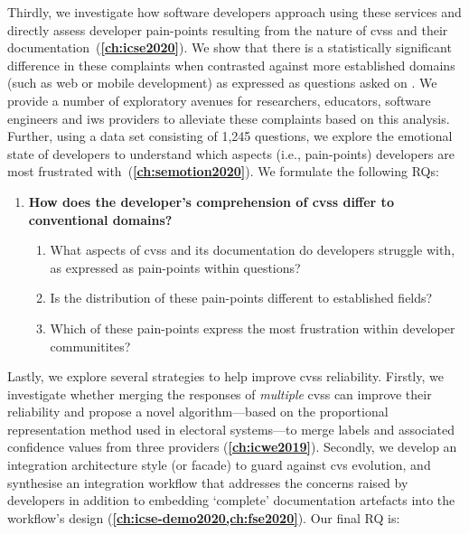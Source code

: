 Thirdly, we investigate how software developers approach using these services and directly assess developer pain-points resulting from the nature of \glspl{cvs} and their documentation~(\textbf{\cref{ch:icse2020}}). We show that there is a statistically significant difference in these complaints when contrasted against more established  domains (such as web or mobile development) as expressed as questions asked on . We provide a number of exploratory avenues for researchers, educators, software engineers and \gls{iws} providers to alleviate these complaints based on this analysis. Further, using a data set consisting of 1,245  questions, we explore the emotional state of developers to understand which aspects (i.e., pain-points) developers are most frustrated with~(\textbf{\cref{ch:semotion2020}}). We formulate the following RQs:

\begin{leftbar}
\begin{enumerate}[label=\faQuestionCircle~~\textbf{RQ\arabic*.}, ref=RQ\arabic*, leftmargin=2.75\parindent, rightmargin=1\parindent,start=3]
  \item \textbf{How does the developer's comprehension of \glspl{cvs} differ to conventional  domains?}\label{rq:icse} %
  \begin{enumerate}[label=\textit{RQ3.\arabic*.}, ref=RQ3.\arabic*]
    \item What aspects of \glspl{cvs} and its documentation do developers struggle with, as expressed as pain-points within  questions?\label{rq:icse:rq1}%
    \item Is the distribution of these pain-points different to established  fields?\label{rq:icse:rq2}%
    \item Which of these pain-points express the most frustration within developer communitites?\label{rq:semotion}
  \end{enumerate}
\end{enumerate}
\end{leftbar}


Lastly, we explore several strategies to help improve \glspl{cvs} reliability. Firstly, we investigate whether merging the responses of \textit{multiple} \glspl{cvs} can improve their reliability and propose a novel algorithm---based on the proportional representation method used in electoral systems---to merge labels and associated confidence values from three providers (\textbf{\cref{ch:icwe2019}}). Secondly, we develop an integration architecture style (or facade) to guard against \gls{cvs} evolution, and synthesise an integration workflow that addresses the concerns raised by developers in addition to embedding `complete' documentation artefacts into the workflow's design (\textbf{\cref{ch:icse-demo2020,ch:fse2020}}). Our final RQ is:

